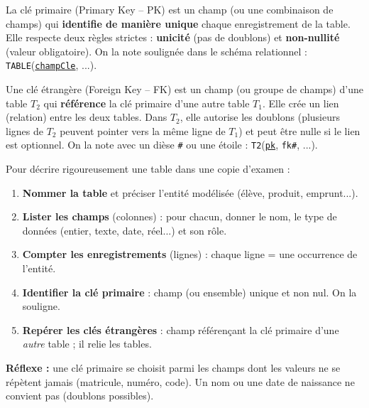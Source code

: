 \documentclass[11pt]{article}
\newcommand{\cle}[1]{{\popxbold\color{popdark}#1}}
\begin{document}
\begin{definition}
La \cle{clé primaire} (Primary Key -- PK) est un champ (ou une combinaison de champs) qui \textbf{identifie de manière unique} chaque enregistrement de la table. Elle respecte deux règles strictes : \textbf{unicité} (pas de doublons) et \textbf{non-nullité} (valeur obligatoire). On la note soulignée dans le schéma relationnel : \texttt{TABLE}(\underline{\texttt{champCle}}, ...).
\end{definition}

\begin{definition}
Une \cle{clé étrangère} (Foreign Key -- FK) est un champ (ou groupe de champs) d'une table $T_2$ qui \textbf{référence} la clé primaire d'une autre table $T_1$. Elle crée un lien (relation) entre les deux tables. Dans $T_2$, elle autorise les doublons (plusieurs lignes de $T_2$ peuvent pointer vers la même ligne de $T_1$) et peut être nulle si le lien est optionnel. On la note avec un dièse \texttt{\#} ou une étoile : \texttt{T2}(\underline{\texttt{pk}}, \texttt{fk\#}, ...).
\end{definition}

\begin{methode}
Pour décrire rigoureusement une table dans une copie d'examen :
\begin{enumerate}
\item \textbf{Nommer la table} et préciser l'entité modélisée (élève, produit, emprunt...).
\item \textbf{Lister les champs} (colonnes) : pour chacun, donner le nom, le type de données (entier, texte, date, réel...) et son rôle.
\item \textbf{Compter les enregistrements} (lignes) : chaque ligne = une occurrence de l'entité.
\item \textbf{Identifier la clé primaire} : champ (ou ensemble) \cle{unique} et \cle{non nul}. On la souligne.
\item \textbf{Repérer les clés étrangères} : champ référençant la clé primaire d'une \emph{autre} table ; il relie les tables.
\end{enumerate}
\textbf{Réflexe :} une clé primaire se choisit parmi les champs dont les valeurs ne se répètent jamais (matricule, numéro, code). Un nom ou une date de naissance ne convient pas (doublons possibles).
\end{methode}
\end{document}
